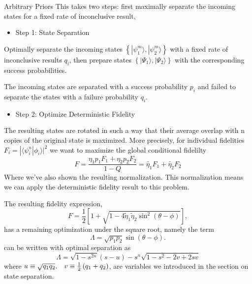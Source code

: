 \documentclass{beamer}
\newcommand{\ke}[1]{|#1\rangle}
\newcommand{\bk}[2]{\langle #1|#2\rangle}
\begin{document}
\begin{frame}{Arbitrary Priors}
This takes two steps: first maximally separate the incoming states for a fixed rate of inconclusive result, 
\begin{itemize}
\item Step 1: State Separation
\end{itemize}
Optimally separate the incoming states $\left\{ \ke{\psi_{1}^{m}},\ke{\psi_{2}^{m}}\right\} $
with a fixed rate of inconclusive results $q_{i}$, then prepare states
$\left\{ \ke{\Psi_{1}},\ke{\Psi_{2}}\right\} $ with the
corresponding success probabilities. 

The incoming states are separated with a success probability $p_{i}$
and failed to separate the states with a failure probability $q_{i}$.
\end{frame}
\begin{frame}
\begin{itemize}
\item Step 2: Optimize Deterministic Fidelity
\end{itemize}
The resulting states are rotated in such a way that their average overlap with n copies of the original state is maximized. 
More precisely, for individual fidelities $F_i = |\bk{\psi_i^n}{\phi_i}|^2$ we want to maximize the global conditional fidelilty 
\[F = \frac{\eta_1 p_1 F_1 + \eta_2 p_2 F_2}{1-Q} = \tilde{\eta_1} F_1 + \tilde{\eta_2} F_2\]
Where we've also shown the resulting normalization.  This normalization means we can apply the deterministic fidelity result to this problem.
\end{frame}
\begin{frame}
The resulting fidelity expression,
\[F  = \frac{1}{2}\left[1+\sqrt{1-4\tilde{\eta}_{1}\tilde{\eta}_{2}\sin^{2}\left(\theta-\phi\right)}\right],\]
  has a remaining optimization under the square root, namely the term
\begin{equation*}
\Lambda =  \sqrt{p_{1}p_{2}}\sin\left(\theta-\phi \right).
\end{equation*}
can be written with optimal separation as
\begin{equation*}
\Lambda = \sqrt{1-s^{2n}}\left(s-u\right)-s^{n}\sqrt{1-s^{2}-2v+2sv}
\end{equation*}
where $u\equiv\sqrt{q_{1}q_{2}},\hspace{0.3cm}v\equiv\frac{1}{2}\left(q_{1}+q_{2}\right)$, 
are variables we introduced in the section on state separation.
\end{frame}
\end{document}
